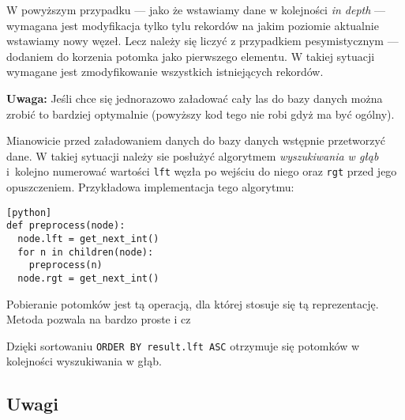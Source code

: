 W powyższym przypadku
--- jako że wstawiamy dane w kolejności \emph{in depth} ---
wymagana jest modyfikacja tylko tylu rekordów na jakim poziomie aktualnie wstawiamy nowy węzeł.
Lecz należy się liczyć z przypadkiem pesymistycznym --- dodaniem do korzenia potomka jako pierwszego elementu.
W takiej sytuacji wymagane jest zmodyfikowanie wszystkich istniejących rekordów.


\textbf{Uwaga:} Jeśli chce się jednorazowo załadować cały las do bazy danych można zrobić to bardziej optymalnie
(powyższy kod tego nie robi gdyż ma być ogólny).

Mianowicie przed załadowaniem danych do bazy danych wstępnie przetworzyć dane.
W takiej sytuacji należy sie posłużyć algorytmem \emph{wyszukiwania w głąb}
i~kolejno numerować wartości \texttt{lft} węzła po wejściu do niego oraz \texttt{rgt} przed jego opuszczeniem.
Przykładowa implementacja tego algorytmu:

\begin{verbatim}[python]
def preprocess(node):
  node.lft = get_next_int()
  for n in children(node):
    preprocess(n)
  node.rgt = get_next_int()
\end{verbatim}






Pobieranie potomków jest tą operacją, dla której stosuje się tą reprezentację.
Metoda pozwala na bardzo proste i cz






Dzięki sortowaniu \texttt{ORDER BY result.lft ASC} otrzymuje się potomków w kolejności wyszukiwania w głąb.

\subsection{Uwagi}

